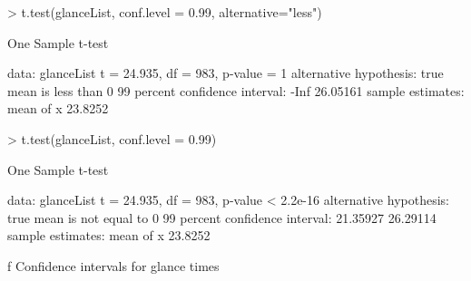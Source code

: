 {
\begtt
> t.test(glanceList, conf.level = 0.99, alternative="less")

        One Sample t-test

data:  glanceList
t = 24.935, df = 983, p-value = 1
alternative hypothesis: true mean is less than 0
99 percent confidence interval:
     -Inf 26.05161
sample estimates:
mean of x 
  23.8252 

> t.test(glanceList, conf.level = 0.99)

        One Sample t-test

data:  glanceList
t = 24.935, df = 983, p-value < 2.2e-16
alternative hypothesis: true mean is not equal to 0
99 percent confidence interval:
 21.35927 26.29114
sample estimates:
mean of x 
  23.8252 
\endtt
}\caption/f Confidence intervals for  glance times
\medskip



\bye
